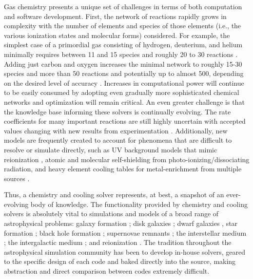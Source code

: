 Gas chemistry presents a unique set of challenges in terms of
both computation and software development.  First, the network of
reactions rapidly grows in complexity with the number of elements and
species of those elements (i.e., the various ionization states and
molecular forms) considered.  For example, the simplest case of a
primordial gas consisting of hydrogen, deuterium, and helium minimally
requires between 11 and 15 species and roughly 20 to 30 reactions
\citep{1997NewA....2..181A, 1998A&A...335..403G}.
Adding just carbon and oxygen increases the minimal network to 
roughly 15-30 species and more than 50 reactions
and potentially up to almost 500, depending on the desired level of
accuracy \citep{2005ApJ...626..627O, 2012MNRAS.421..116G}.  Increases in
computational power will continue to be easily consumed by adopting
even gradually more sophisticated chemical networks and optimization
will remain critical.  An even greater challenge is that the
knowledge base
informing these solvers is continually evolving.  The rate
coefficients for many important reactions are still highly uncertain
\citep{2008MNRAS.388.1627G, 2011ApJ...726...55T} with accepted values
changing with new results from experimentation
\citep{2010Sci...329...69K, 2015ApJS..219....6O, 2016ApJ...816...31D}.
Additionally, new models are frequently created to account for
phenomena that are difficult to resolve or simulate directly, such as
UV background models that mimic reionization
\citep[e.g.,][]{1996ApJ...461...20H, 2001cghr.confE..64H,
2012ApJ...746..125H, 2009ApJ...703.1416F}, atomic
\citep{2013MNRAS.430.2427R} and molecular \citep{1996ApJ...468..269D,
2012MNRAS.425L..51W} self-shielding from photo-ionizing/dissociating
radiation, and heavy element cooling tables for metal-enrichment from
multiple sources \citep[e.g.,][]{2009MNRAS.393...99W,
2013MNRAS.433.3005D}.

Thus, a chemistry and cooling solver
represents, at best, a snapshot of an ever-evolving body of
knowledge.  The functionality provided by chemistry and cooling solvers is
absolutely vital to simulations and models of a broad range of
astrophysical problems: galaxy formation \citep{2016ApJ...830L..13M,
2016MNRAS.462.3265D, 2017MNRAS.465.2540P, 2017MNRAS.466..105A,
2017MNRAS.tmp..110D}; disk galaxies \citep{2015MNRAS.449.2588P,
2015ApJ...814..131G}; dwarf galaxies \citep{2017arXiv170108779H}, 
star formation \citep{2016Natur.535..523F, 2017ApJ...835..137W};
black hole formation \citep{2016MNRAS.459.3217L, 2016MNRAS.459.4209A,
2016MNRAS.459.3377R, 2016MNRAS.461..111R}; supernovae remnants
\citep{2012ApJ...748...12S, 2016arXiv161008528B, 2017MNRAS.465.2471G};
the interstellar medium \citep{2015ApJ...814....4L,
2016arXiv161201786K}; the intergalactic medium
\citep{2011ApJ...731....6S, 2011MNRAS.413..190T, 2012MNRAS.420..829O};
and reionization \citep{2014ApJ...789L..32K, 2015ApJ...811....3S}.
The tradition throughout the astrophysical simulation community has
been to develop in-house solvers, geared to the specific design of
each code and baked directly into the source, making abstraction and
direct comparison between codes extremely difficult.
